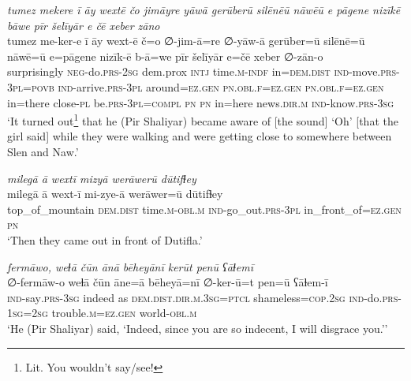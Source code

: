 \ea \label{ŽP.175}
\textit{tumez mekere ī āy wextē čo jimāyre yāwā gerūberū silēnēū nāwēū e pāgene nizīkē bāwe pīr šelīyār e čē xeber zāno} \\ 
\gll tumez me-ker-e ī āy wext-ē č=o ∅-jim-ā=re ∅-yāw-ā gerūber=ū silēnē=ū nāwē=ū e=pāgene nizīk-ē b-ā=we pīr šelīyār e=čē xeber ∅-zān-o \\ 
 surprisingly \textsc{neg-}do\textsc{.prs}-\textsc{2sg} dem.prox \textsc{intj} time\textsc{.m}\textsc{-indf} in=\textsc{dem.dist} \textsc{ind-}move\textsc{.prs}\textsc{-3pl}\textsc{=\textsc{povb}} \textsc{ind-}arrive\textsc{.prs}\textsc{-3pl} around\textsc{\textsc{=ez.gen}} \textsc{pn}\textsc{.obl}\textsc{.f}\textsc{\textsc{=ez.gen}} \textsc{pn}\textsc{.obl}\textsc{.f}\textsc{\textsc{=ez.gen}} in=there close\textsc{\textsc{-pl}} be\textsc{.prs}\textsc{-3pl}\textsc{=compl} \textsc{pn} \textsc{pn} in=here news\textsc{.dir}\textsc{.m} \textsc{ind-}know\textsc{.prs}\textsc{-3sg} \\ 
\glt `It turned out\footnote{Lit. You wouldn’t say/see!} that he (Pir Shaliyar) became aware of [the sound] ‘Oh’ [that the girl said] while they were walking and were getting close to somewhere between Slen and Naw.'
\z 
 
\ea \label{ŽP.187}
\textit{milegā ā wextī mizyā werāwerū dūtifɫey} \\ 
\gll milegā ā wext-ī mi-zye-ā werāwer=ū dūtifɫey \\ 
 top\_of\_mountain \textsc{dem.dist} time\textsc{.m}\textsc{-obl}\textsc{.m} \textsc{ind-}go\_out\textsc{.prs}\textsc{-3pl} in\_front\_of\textsc{\textsc{=ez.gen}} \textsc{pn} \\ 
\glt `Then they came out in front of  Dutifla.'
\z 
 
\ea \label{ŽP.198}
\textit{fermāwo, weɫā čūn ānā bēheyānī kerūt penū ʕāɫemī} \\ 
\gll ∅-fermāw-o weɫā čūn āne=ā bēheyā=nī ∅-ker-ū=t pen=ū ʕāɫem-ī \\ 
 \textsc{ind-}say\textsc{.prs}\textsc{-3sg} indeed as \textsc{dem.dist}\textsc{.dir}\textsc{.m}\textsc{.3sg}=\textsc{ptcl} shameless\textsc{=cop}\textsc{.\textsc{2sg}} \textsc{ind-}do\textsc{.prs}\textsc{-\textsc{1sg}}\textsc{=\textsc{2sg}} trouble\textsc{.m}\textsc{\textsc{=ez.gen}} world\textsc{-obl}\textsc{.m} \\ 
\glt `He (Pir Shaliyar) said, ‘Indeed, since you are so indecent, I will disgrace you.’'
\z 
 
